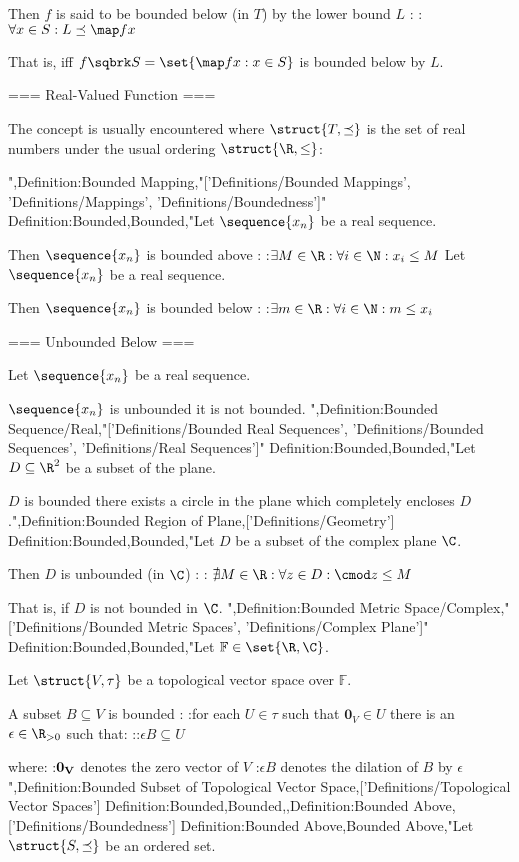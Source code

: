 Then $f$ is said to be bounded below (in $T$) by the lower bound $L$ :
:$\forall x \in S: L \preceq \map f x$


That is, iff $f \sqbrk S = \set {\map f x: x \in S}$ is bounded below by $L$.


=== Real-Valued Function ===

The concept is usually encountered where $\struct {T, \preceq}$ is the set of real numbers under the usual ordering $\struct {\R, \le}$:


",Definition:Bounded Mapping,"['Definitions/Bounded Mappings', 'Definitions/Mappings', 'Definitions/Boundedness']"
Definition:Bounded,Bounded,"Let $\sequence {x_n}$ be a real sequence.


Then $\sequence {x_n}$ is bounded above :
:$\exists M \in \R: \forall i \in \N: x_i \le M$
Let $\sequence {x_n}$ be a real sequence.


Then $\sequence {x_n}$ is bounded below :
:$\exists m \in \R: \forall i \in \N: m \le x_i$


=== Unbounded Below ===

Let $\sequence {x_n}$ be a real sequence.


$\sequence {x_n}$ is unbounded  it is not bounded.
",Definition:Bounded Sequence/Real,"['Definitions/Bounded Real Sequences', 'Definitions/Bounded Sequences', 'Definitions/Real Sequences']"
Definition:Bounded,Bounded,"Let $D \subseteq \R^2$ be a subset of the plane.

$D$ is bounded  there exists a circle in the plane which completely encloses $D$.",Definition:Bounded Region of Plane,['Definitions/Geometry']
Definition:Bounded,Bounded,"Let $D$ be a subset of the complex plane $\C$.


Then $D$ is unbounded (in $\C$) :
: $\nexists M \in \R: \forall z \in D: \cmod z \le M$

That is, if $D$ is not bounded in $\C$.
",Definition:Bounded Metric Space/Complex,"['Definitions/Bounded Metric Spaces', 'Definitions/Complex Plane']"
Definition:Bounded,Bounded,"Let $\mathbb F \in \set {\R, \C}$.

Let $\struct {V, \tau}$ be a topological vector space over $\mathbb F$.


A subset $B \subseteq V$ is bounded :
:for each $U \in \tau$ such that $\mathbf 0_V \in U$ there is an $\epsilon \in \R_{>0}$ such that:
::$\epsilon B \subseteq U$

where:
:$\bf 0_V$ denotes the zero vector of $V$
:$\epsilon B$ denotes the dilation of $B$ by $\epsilon$",Definition:Bounded Subset of Topological Vector Space,['Definitions/Topological Vector Spaces']
Definition:Bounded,Bounded,,Definition:Bounded Above,['Definitions/Boundedness']
Definition:Bounded Above,Bounded Above,"Let $\struct {S, \preceq}$ be an ordered set.


